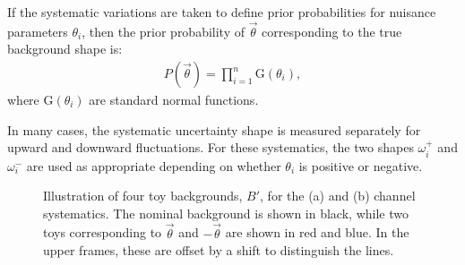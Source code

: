 If the systematic variations are taken to define prior probabilities for nuisance parameters $\theta_i$, then the prior probability of $\vec{\theta}$ corresponding to the true background shape is:
\begin{equation}\begin{split}
    P(\vec{\theta})=\prod_{i=1}^n \text{G}(\theta_i),
\end{split}\end{equation} 
where $\text{G}(\theta_i)$ are standard normal functions.

In many cases, the systematic uncertainty shape is measured separately for upward and downward fluctuations.
For these systematics, the two shapes $\omega^+_i$ and $\omega^-_i$ are used as appropriate depending on whether $\theta_i$ is positive or negative.

\begin{figure}[h!]
\captionsetup[subfigure]{position=b}
\centering
{}
\caption{Illustration of four toy backgrounds, $B'$, for the \ee (a) and \mm (b) channel systematics. The nominal background is shown in black, while two toys corresponding to $\vec{\theta}$ and $-\vec{\theta}$ are shown in red and blue. In the upper frames, these are offset by a shift to distinguish the lines.}
\label{fig:bkgToyEnsamble}
\end{figure}

